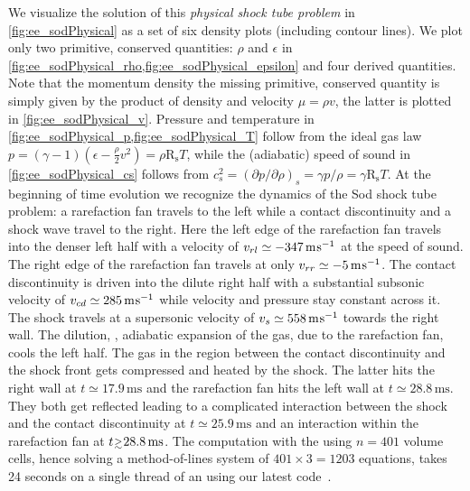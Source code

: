We visualize the solution of this \textit{physical shock tube problem} in \cref{fig:ee_sodPhysical} as a set of six density plots (including contour lines).
We plot only two primitive, conserved quantities: $\rho$ and $\epsilon$ in \cref{fig:ee_sodPhysical_rho,fig:ee_sodPhysical_epsilon} and four derived quantities.
Note that the momentum density \dash{} the missing primitive, conserved quantity \dash{} is simply given by the product of density and velocity $\mu=\rho v$, the latter is plotted in \cref{fig:ee_sodPhysical_v}.
Pressure and temperature in \cref{fig:ee_sodPhysical_p,fig:ee_sodPhysical_T} follow from the ideal gas law $p=(\gamma-1)(\epsilon-\tfrac{\rho}{2}v^2)=\rho \mathrm{R}_\mathrm{s} T$, while the (adiabatic) speed of sound in \cref{fig:ee_sodPhysical_cs} follows from $c_s^2=(\partial p/\partial \rho)_s=\gamma p/\rho=\gamma\mathrm{R}_\mathrm{s}T$.
At the beginning of time evolution we recognize the dynamics of the Sod shock tube problem: a rarefaction fan travels to the left while a contact discontinuity and a shock wave travel to the right.
Here the left edge of the rarefaction fan travels into the denser left half with a velocity of $v_{rl}\simeq -347\,\mathrm{m}\mkern1.0mu\mathrm{s}^{-1}$ at the speed of sound.
The right edge of the rarefaction fan travels at only $v_{rr}\simeq-5\,\mathrm{m}\mkern1.0mu\mathrm{s}^{-1}$.
The contact discontinuity is driven into the dilute right half with a substantial subsonic velocity of $v_{cd}\simeq 285\,\mathrm{m}\mkern1.0mu\mathrm{s}^{-1}$ while velocity and pressure stay constant across it.
The shock travels at a supersonic velocity of $v_s\simeq 558\,\mathrm{m}\mkern1.0mu\mathrm{s}^{-1}$ towards the right wall.
The dilution, \ie{}, adiabatic expansion of the gas, due to the rarefaction fan, cools the left half.
The gas in the region between the contact discontinuity and the shock front gets compressed and heated by the shock.
The latter hits the right wall at $t\simeq 17.9\,\mathrm{ms}$ and the rarefaction fan hits the left wall at $t\simeq 28.8\,\mathrm{ms}$.
They both get reflected leading to a complicated interaction between the shock and the contact discontinuity at $t\simeq 25.9\,\mathrm{ms}$ and an interaction within the rarefaction fan at $t\smallergtrsim 28.8\,\mathrm{ms}$.
The computation with the \ktScheme{} using $n=401$ volume cells, hence solving a method-of-lines \ode{} system of $401\times 3 = 1203$ equations, takes 24 seconds on a single thread of an \intel{} using our latest \WAM{} code~\cite{Steil:2023PhDFVNB}.
\clearpage

